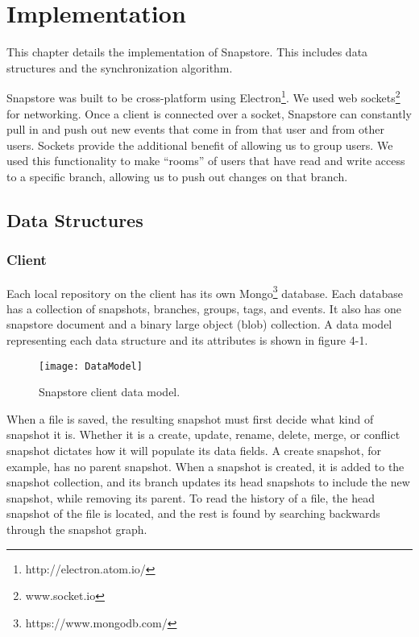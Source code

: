 \chapter{Implementation}

This chapter details the implementation of Snapstore. This includes data structures and the synchronization algorithm. 

Snapstore was built to be cross-platform using Electron\footnote{http://electron.atom.io/}. We used web sockets\footnote{www.socket.io} for networking. Once a client is connected over a socket, Snapstore can constantly pull in and push out new events that come in from that user and from other users. Sockets provide the additional benefit of allowing us to group users. We used this functionality to make ``rooms'' of users that have read and write access to a specific branch, allowing us to push out changes on that branch.

\section{Data Structures}

\subsection{Client}

Each local repository on the client has its own Mongo\footnote{https://www.mongodb.com/} database. Each database has a collection of snapshots, branches, groups, tags, and events. It also has one snapstore document and a binary large object (blob) collection. A data model representing each data structure and its attributes is shown in figure 4-1.

\begin{figure}
\texttt{[image: DataModel]}
\caption{Snapstore client data model.}
\label{arm:fig1}
\end{figure}

When a file is saved, the resulting snapshot must first decide what kind of snapshot it is. Whether it is a create, update, rename, delete, merge, or conflict snapshot dictates how it will populate its data fields. A create snapshot, for example, has no parent snapshot. When a snapshot is created, it is added to the snapshot collection, and its branch updates its head snapshots to include the new snapshot, while removing its parent. To read the history of a file, the head snapshot of the file is located, and the rest is found by searching backwards through the snapshot graph.

